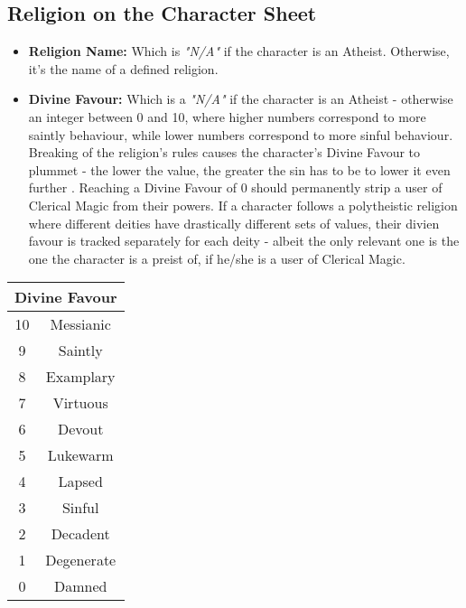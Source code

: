 \subsection{Religion on the Character Sheet}
\begin{itemize}
\item \textbf{Religion Name:} Which is \textit{"N/A"} if the character is an Atheist. Otherwise, it's the name of a defined religion.
\item \textbf{Divine Favour:} Which is a \textit{"N/A"} if the character is an Atheist - otherwise an integer between 0 and 10, where higher numbers correspond to more saintly behaviour, while lower numbers correspond to more sinful behaviour. Breaking of the religion's rules causes the character's Divine Favour to plummet - the lower the value, the greater the sin has to be to lower it even further . Reaching a Divine Favour of 0 should permanently strip a user of Clerical Magic from their powers. If a character follows a polytheistic religion where different deities have drastically different sets of values, their divien favour is tracked separately for each deity - albeit the only relevant one is the one the character is a preist of, if he/she is a user of Clerical Magic.
\end{itemize}
\begin{tabular}{|c|c|}
\hline
\multicolumn{2}{|c|}{\textbf{Divine Favour}} \\ \hline
10 & Messianic \\ \hline
9 & Saintly \\ \hline
8 & Examplary \\ \hline
7 & Virtuous \\ \hline
6 & Devout \\ \hline
5 & Lukewarm \\ \hline
4 & Lapsed \\ \hline
3 & Sinful \\ \hline
2 & Decadent \\ \hline
1 & Degenerate \\ \hline
0 & Damned \\ \hline
\end{tabular}
